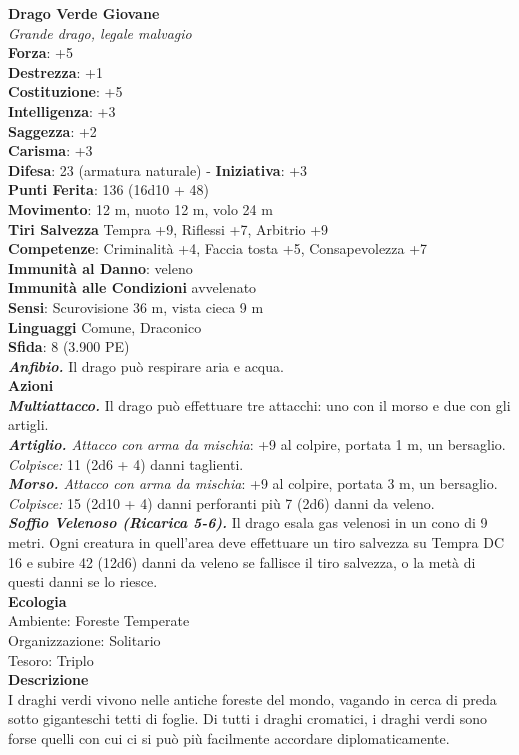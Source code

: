 \begin{multicols}{2}
\medskip\textbf{Drago Verde Giovane}\\
\emph{Grande drago, legale malvagio}\\
\textbf{Forza}: +5\\
\textbf{Destrezza}: +1\\
\textbf{Costituzione}: +5\\
\textbf{Intelligenza}: +3\\
\textbf{Saggezza}: +2\\
\textbf{Carisma}: +3\\
\textbf{Difesa}: 23 (armatura naturale) - \textbf{Iniziativa}: +3\\
\textbf{Punti Ferita}: 136 (16d10 + 48)\\
\textbf{Movimento}: 12 m, nuoto 12 m, volo 24 m\\
\textbf{Tiri Salvezza} Tempra +9, Riflessi +7, Arbitrio +9\\
\textbf{Competenze}: Criminalità +4, Faccia tosta +5, Consapevolezza +7\\
\textbf{Immunità al Danno}: veleno\\
\textbf{Immunità alle Condizioni} avvelenato\\
\textbf{Sensi}: Scurovisione 36 m, vista cieca 9 m \\
\textbf{Linguaggi} Comune, Draconico\\
\textbf{Sfida}: 8 (3.900 PE)\smallskip\\
\emph{\textbf{Anfibio.}} Il drago può respirare aria e acqua. \\
\smallskip\textbf{Azioni}\\
\emph{\textbf{Multiattacco.}} Il drago può effettuare tre attacchi: uno con il morso e due con gli artigli.\\
\emph{\textbf{Artiglio.} Attacco con arma da mischia}: +9 al colpire, portata 1 m, un bersaglio.\\
\emph{Colpisce:} 11 (2d6 + 4) danni taglienti.\\
\emph{\textbf{Morso.} Attacco con arma da mischia}: +9 al colpire, portata 3 m, un bersaglio.\\
\emph{Colpisce:} 15 (2d10 + 4) danni perforanti più 7 (2d6) danni da veleno.\\
\emph{\textbf{Soffio Velenoso (Ricarica 5-6).}} Il drago esala gas velenosi in un cono di 9 metri. Ogni creatura in quell'area deve effettuare un tiro salvezza su Tempra DC  16 e subire 42 (12d6) danni da veleno se fallisce il tiro salvezza, o la metà di questi danni se lo riesce.\\
\textbf{Ecologia}\\
Ambiente: Foreste Temperate\\
Organizzazione: Solitario\\
Tesoro: Triplo\\
\textbf{Descrizione}\\
I draghi verdi vivono nelle antiche foreste del mondo, vagando in cerca di preda sotto giganteschi tetti di foglie. Di tutti i draghi cromatici, i draghi verdi sono forse quelli con cui ci si può più facilmente accordare diplomaticamente.\\


\end{multicols}
